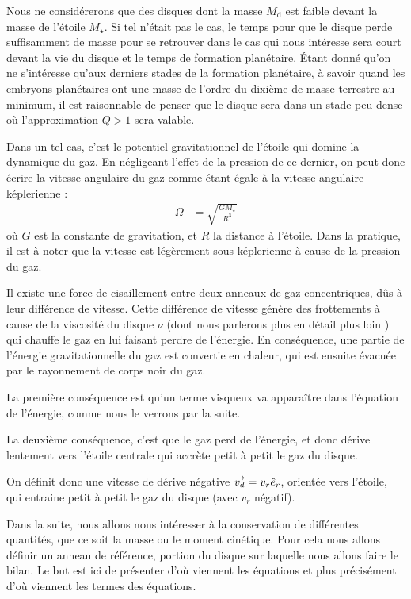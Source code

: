Nous ne considérerons que des disques dont la masse $M_\text{d}$ est faible devant la masse de l'étoile $M_\star$. Si tel n'était pas le cas, le temps pour que le disque perde suffisamment de masse pour se retrouver dans le cas qui nous intéresse sera court devant la vie du disque et le temps de formation planétaire. Étant donné qu'on ne s'intéresse qu'aux derniers stades de la formation planétaire, à savoir quand les embryons planétaires ont une masse de l'ordre du dixième de masse terrestre au minimum, il est raisonnable de penser que le disque sera dans un stade peu dense où l'approximation $Q>1$ sera valable.

Dans un tel cas, c'est le potentiel gravitationnel de l'étoile qui domine la dynamique du gaz. En négligeant l'effet de la pression de ce dernier, on peut donc écrire la vitesse angulaire du gaz comme étant égale à la vitesse angulaire képlerienne : 
\begin{align}
\Omega &= \sqrt{\frac{GM_\star}{R^3}}
\end{align}
où $G$ est la constante de gravitation, et $R$ la distance à l'étoile. Dans la pratique, il est à noter que la vitesse est légèrement sous-képlerienne à cause de la pression du gaz. 

\bigskip

Il existe une force de cisaillement entre deux anneaux de gaz concentriques, dûs à leur différence de vitesse. Cette différence de vitesse génère des frottements à cause de la viscosité du disque $\nu$ (dont nous parlerons plus en détail plus loin ) qui chauffe le gaz en lui faisant perdre de l'énergie. En conséquence, une partie de l'énergie gravitationnelle du gaz est convertie en chaleur, qui est ensuite évacuée par le rayonnement de corps noir du gaz. 

\bigskip

La première conséquence est qu'un terme visqueux va apparaître dans l'équation de l'énergie, comme nous le verrons par la suite. 

La deuxième conséquence, c'est que le gaz perd de l'énergie, et donc dérive lentement vers l'étoile centrale qui accrète petit à petit le gaz du disque. 

On définit donc une vitesse de dérive négative ${\overrightarrow{v_d}} = v_r \hat{e}_r$, orientée vers l'étoile, qui entraine petit à petit le gaz du disque (avec $v_r$ négatif).

Dans la suite, nous allons nous intéresser à la conservation de différentes quantités, que ce soit la masse ou le moment cinétique. Pour cela nous allons définir un anneau de référence, portion du disque sur laquelle nous allons faire le bilan. Le but est ici de présenter d'où viennent les équations et plus précisément d'où viennent les termes des équations. 

